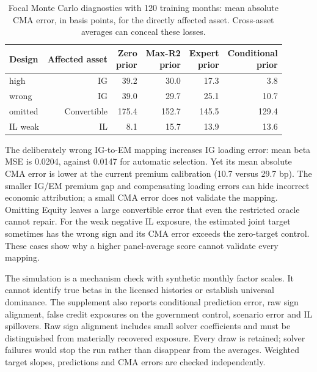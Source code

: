 \documentclass[a4paper,review]{cas-sc}
\begin{document}
\begin{table}[pos=htbp]
\centering
\small
\caption{Focal Monte Carlo diagnostics with 120 training months: mean absolute CMA error, in basis points, for the directly affected asset. Cross-asset averages can conceal these losses.}
\begin{adjustbox}{max width=\linewidth}
\begin{tabular}{lrrrrr}
\toprule
Design & Affected asset & \shortstack{Zero\\prior} & \shortstack{Max-R2\\prior} & \shortstack{Expert\\prior} & \shortstack{Conditional\\prior} \\
\midrule
high & IG & 39.2 & 30.0 & 17.3 & 3.8 \\
wrong & IG & 39.0 & 29.7 & 25.1 & 10.7 \\
omitted & Convertible & 175.4 & 152.7 & 145.5 & 129.4 \\
IL weak & IL & 8.1 & 15.7 & 13.9 & 13.6 \\
\bottomrule
\end{tabular}
\end{adjustbox}
\end{table}

The deliberately wrong IG-to-EM mapping increases IG loading error: mean beta MSE is 0.0204, against 0.0147 for automatic selection. Yet its mean absolute CMA error is lower at the current premium calibration (10.7 versus 29.7 bp). The smaller IG/EM premium gap and compensating loading errors can hide incorrect economic attribution; a small CMA error does not validate the mapping. Omitting Equity leaves a large convertible error that even the restricted oracle cannot repair. For the weak negative IL exposure, the estimated joint target sometimes has the wrong sign and its CMA error exceeds the zero-target control. These cases show why a higher panel-average score cannot validate every mapping.

The simulation is a mechanism check with synthetic monthly factor scales. It cannot identify true betas in the licensed histories or establish universal dominance. The supplement also reports conditional prediction error, raw sign alignment, false credit exposures on the government control, scenario error and IL spillovers. Raw sign alignment includes small solver coefficients and must be distinguished from materially recovered exposure. Every draw is retained; solver failures would stop the run rather than disappear from the averages. Weighted target slopes, predictions and CMA errors are checked independently.
\end{document}

